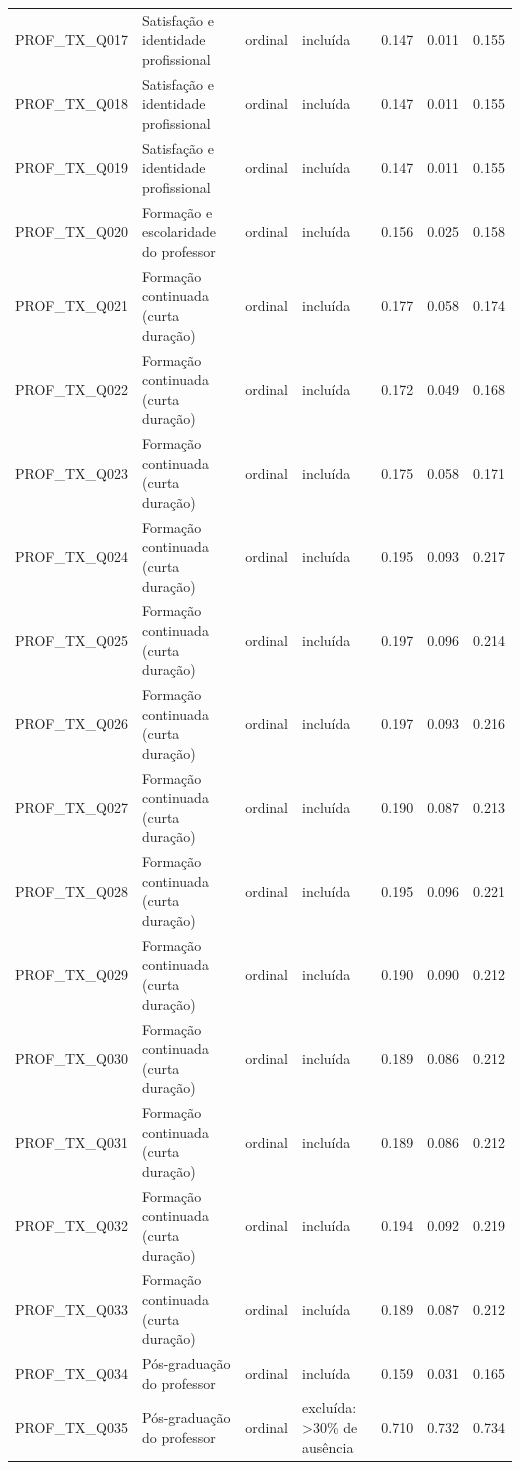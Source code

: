 \begin{tabular}{llllrrr}
PROF\_TX\_Q017 & Satisfação e identidade profissional & ordinal & incluída & 0.147 & 0.011 & 0.155 \\
PROF\_TX\_Q018 & Satisfação e identidade profissional & ordinal & incluída & 0.147 & 0.011 & 0.155 \\
PROF\_TX\_Q019 & Satisfação e identidade profissional & ordinal & incluída & 0.147 & 0.011 & 0.155 \\
PROF\_TX\_Q020 & Formação e escolaridade do professor & ordinal & incluída & 0.156 & 0.025 & 0.158 \\
PROF\_TX\_Q021 & Formação continuada (curta duração) & ordinal & incluída & 0.177 & 0.058 & 0.174 \\
PROF\_TX\_Q022 & Formação continuada (curta duração) & ordinal & incluída & 0.172 & 0.049 & 0.168 \\
PROF\_TX\_Q023 & Formação continuada (curta duração) & ordinal & incluída & 0.175 & 0.058 & 0.171 \\
PROF\_TX\_Q024 & Formação continuada (curta duração) & ordinal & incluída & 0.195 & 0.093 & 0.217 \\
PROF\_TX\_Q025 & Formação continuada (curta duração) & ordinal & incluída & 0.197 & 0.096 & 0.214 \\
PROF\_TX\_Q026 & Formação continuada (curta duração) & ordinal & incluída & 0.197 & 0.093 & 0.216 \\
PROF\_TX\_Q027 & Formação continuada (curta duração) & ordinal & incluída & 0.190 & 0.087 & 0.213 \\
PROF\_TX\_Q028 & Formação continuada (curta duração) & ordinal & incluída & 0.195 & 0.096 & 0.221 \\
PROF\_TX\_Q029 & Formação continuada (curta duração) & ordinal & incluída & 0.190 & 0.090 & 0.212 \\
PROF\_TX\_Q030 & Formação continuada (curta duração) & ordinal & incluída & 0.189 & 0.086 & 0.212 \\
PROF\_TX\_Q031 & Formação continuada (curta duração) & ordinal & incluída & 0.189 & 0.086 & 0.212 \\
PROF\_TX\_Q032 & Formação continuada (curta duração) & ordinal & incluída & 0.194 & 0.092 & 0.219 \\
PROF\_TX\_Q033 & Formação continuada (curta duração) & ordinal & incluída & 0.189 & 0.087 & 0.212 \\
PROF\_TX\_Q034 & Pós-graduação do professor & ordinal & incluída & 0.159 & 0.031 & 0.165 \\
PROF\_TX\_Q035 & Pós-graduação do professor & ordinal & excluída: >30\% de ausência & 0.710 & 0.732 & 0.734 \\

\end{tabular}
